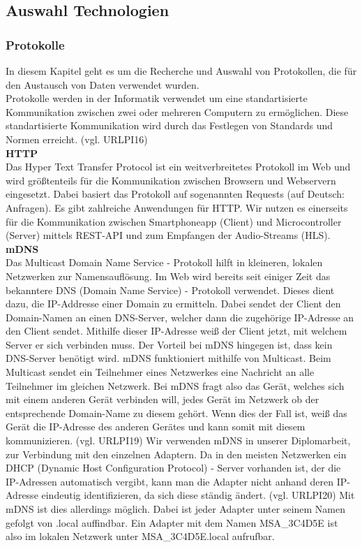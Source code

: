 \documentclass[11pt, twoside]{article}
\begin{document}
\subsection{Auswahl Technologien}
\subsubsection{Protokolle}
In diesem Kapitel geht es um die Recherche und Auswahl von Protokollen, die für den Austausch von Daten verwendet wurden. \newline \\
Protokolle werden in der Informatik verwendet um eine standartisierte Kommunikation zwischen zwei oder mehreren Computern zu ermöglichen. Diese standartisierte Kommunikation wird durch das Festlegen von Standards und Normen erreicht. (vgl. URLPI16)
\newline \\
\textbf{HTTP} \\
Das Hyper Text Transfer Protocol ist ein weitverbreitetes Protokoll im Web und wird größtenteils für die Kommunikation zwischen Browsern und Webservern eingesetzt. Dabei basiert das Protokoll auf sogenannten \glqq Requests\grqq{} (auf Deutsch: Anfragen). Es gibt zahlreiche Anwendungen für HTTP. Wir nutzen es einerseits für die Kommunikation zwischen Smartphoneapp (Client) und Microcontroller (Server) mittels REST-API und zum Empfangen der Audio-Streams (HLS). \parencite[vgl.][]{noauthor_urlpi01_2020}
\newline \\
\textbf{mDNS} \\
Das Multicast Domain Name Service - Protokoll hilft in kleineren, lokalen Netzwerken zur Namensauflösung. Im Web wird bereits seit einiger Zeit das bekanntere DNS (Domain Name Service) - Protokoll verwendet. Dieses dient dazu, die IP-Addresse einer Domain zu ermitteln. Dabei sendet der Client den Domain-Namen an einen DNS-Server, welcher dann die zugehörige IP-Adresse an den Client sendet. Mithilfe dieser IP-Adresse weiß der Client jetzt, mit welchem Server er sich verbinden muss. Der Vorteil bei mDNS hingegen ist, dass kein DNS-Server benötigt wird. mDNS funktioniert mithilfe von Multicast. Beim Multicast sendet ein Teilnehmer eines Netzwerkes eine Nachricht an alle Teilnehmer im gleichen Netzwerk. Bei mDNS fragt also das Gerät, welches sich mit einem anderen Gerät verbinden will, jedes Gerät im Netzwerk ob der entsprechende Domain-Name zu diesem gehört. Wenn dies der Fall ist, weiß das Gerät die IP-Adresse des anderen Gerätes und kann somit mit diesem kommunizieren. (vgl. URLPI19) Wir verwenden mDNS in unserer Diplomarbeit, zur Verbindung mit den einzelnen Adaptern. Da in den meisten Netzwerken ein DHCP (Dynamic Host Configuration Protocol) - Server vorhanden ist, der die IP-Adressen automatisch vergibt, kann man die Adapter nicht anhand deren IP-Adresse eindeutig identifizieren, da sich diese ständig ändert. (vgl. URLPI20) Mit mDNS ist dies allerdings möglich. Dabei ist jeder Adapter unter seinem Namen gefolgt von .local auffindbar. Ein Adapter mit dem Namen MSA\_3C4D5E ist also im lokalen Netzwerk unter MSA\_3C4D5E.local aufrufbar.
\end{document}
